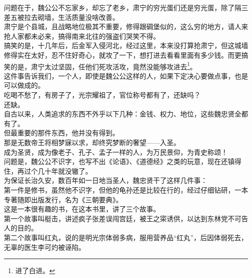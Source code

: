 \begin{multicols}{\theparacolNo}
问题在于，魏公公不忘家乡，却忘了老乡，肃宁的穷光蛋们还是穷光蛋，除了隔三差五被拉去砌墙，生活质量没啥改善。\\

肃宁是个县城，且战略地位极其不重要，修得跟碉堡似的，这么穷的地方，请人来抢人家都未必来，搞得南来北往的强盗们哭笑不得。\\

搞笑的是，十几年后，后金军入侵河北，经过这里，本来没打算抢肃宁，但这城墙修得实在太好，忍不住好奇心，就攻了一下，想打进去看看里面有多少钱。而更搞笑的是，肃宁太过坚固，任他们死攻活攻，竟然没能够攻进去\footnote{进了白进。}。\\

这件事告诉我们，一个人，即使是魏公公这样的人，如果下定决心要做点事，也是可以做成的。\\

吃喝不愁了，有房子了，光宗耀祖了，官位称号都有了，还缺吗？\\

还缺。\\

自古以来，人类追求的东西不外乎以下几种：金钱、权力、地位，这些魏忠贤全都有了。\\

但最重要的那件东西，他并没有得到。\\

那是无数帝王将相梦寐以求，却终究梦断的奢望——入圣。\\

成为圣贤，成为像老子、孔子、孟子一样的人，为万民景仰，为青史称颂！\\

问题是，魏公公不识字，也写不出《论语》、《道德经》之类的玩意，现在还镇得住，再过个几十年就没辙了。\\

为保证长治久安，数百年如一日地当圣人，魏忠贤干了这样几件事：\\

第一件是修书，虽然他不识字，但他的龟孙还是比较在行的，经过仔细钻研，一本专著随即出版发行，名为《三朝要典》。\\

这是一本很有趣的书，在这本书里，讲了三个故事。\\

第一个故事叫梃击，讲述疯子张差误闯宫廷，被王之寀诱供，以达到东林党不可告人的目的。\\

第二个故事叫红丸，说的是明光宗体弱多病，服用营养品“红丸”，后因体弱死去，无辜的医生李可灼被诬陷。\\


\end{multicols}
